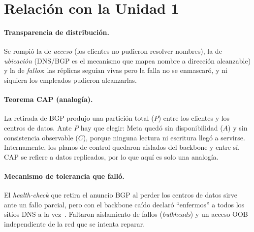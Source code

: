 \documentclass[10pt,a4paper]{article}
\begin{document}
\section{Relación con la Unidad 1}
\paragraph{Transparencia de distribución.} Se rompió la de \textit{acceso} (los clientes no pudieron resolver nombres), la de \textit{ubicación} (DNS/BGP es el mecanismo que mapea nombre a dirección alcanzable) y la de \textit{fallos}: las réplicas seguían vivas pero la falla no se enmascaró, y ni siquiera los empleados pudieron alcanzarlas.

\paragraph{Teorema CAP (analogía).} La retirada de BGP produjo una partición total ($P$) entre los clientes y los centros de datos. Ante $P$ hay que elegir: Meta quedó sin disponibilidad ($A$) y sin consistencia observable ($C$), porque ninguna lectura ni escritura llegó a servirse. Internamente, los planos de control quedaron aislados del backbone y entre sí. CAP se refiere a datos replicados, por lo que aquí es solo una analogía.

\paragraph{Mecanismo de tolerancia que falló.} El \textit{health-check} que retira el anuncio BGP al perder los centros de datos sirve ante un fallo parcial, pero con el backbone caído declaró ``enfermos'' a todos los sitios DNS a la vez~\cite{janardhan2021outage}. Faltaron aislamiento de fallos (\textit{bulkheads}) y un acceso OOB independiente de la red que se intenta reparar.
\end{document}
